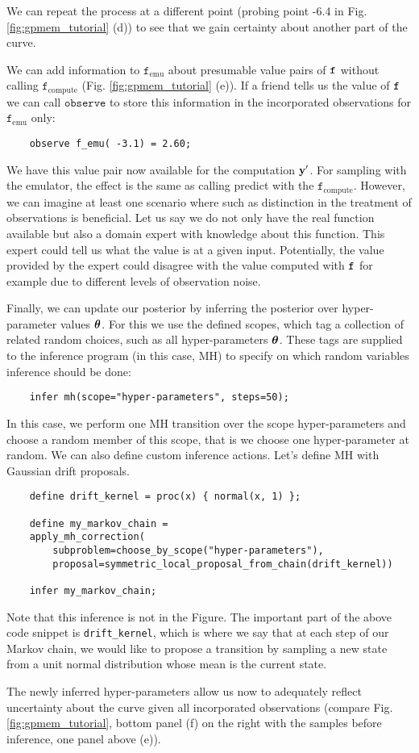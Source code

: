 We can repeat the process at a different point (probing point -6.4 in Fig.
\ref{fig:gpmem_tutorial} (d)) to see that we gain certainty about another part of the curve. 

We can add information to $\texttt{f}_\text{emu}$ about presumable value pairs of $\texttt{f}$ without calling $\texttt{f}_\text{compute}$
(Fig. \ref{fig:gpmem_tutorial} (e)).
If a friend tells us the value of $\texttt{f}$ we can call $\texttt{observe}$ to store this information in the incorporated observations for $\texttt{f}_\text{emu}$ only:
    \begin{lstlisting}
    observe f_emu( -3.1) = 2.60;
    \end{lstlisting}
We have this value pair now available for the computation $\mathbf{y}^\prime$. 
For sampling with the emulator, the effect is the same as calling predict with the $\texttt{f}_\text{compute}$.
However, we can imagine at least one scenario where such as distinction in the treatment of observations 
is beneficial. Let us say we do not only have the real function available but also a domain expert with knowledge 
about this function.
This expert could tell us what the value is at a given input.
Potentially, the value provided by the expert could disagree with the value computed with $\texttt{f}$ for example 
due to different levels of observation noise. 

Finally, we can update our posterior by inferring the posterior over hyper-parameter values $\bm{\theta}$.
For this we use the defined scopes, which tag a collection of related random choices, such
as all hyper-parameters $\bm{\theta}$.
These tags are supplied to the
inference program (in this case, MH) to specify on which random variables inference
should be done:
    \begin{lstlisting}
    infer mh(scope="hyper-parameters", steps=50);
    \end{lstlisting}
In this case, we perform one \ac{MH} transition over the scope hyper-parameters
and choose a random member of this scope, that is we choose one hyper-parameter at random.
We can also define custom inference actions. Let's define \ac{MH} with Gaussian
drift proposals.
    \begin{lstlisting}
    define drift_kernel = proc(x) { normal(x, 1) };

    define my_markov_chain =
	apply_mh_correction(
	    subproblem=choose_by_scope("hyper-parameters"),
	    proposal=symmetric_local_proposal_from_chain(drift_kernel))

    infer my_markov_chain;
    \end{lstlisting}
Note that this inference is not in the Figure. The important part of the above code snippet is \texttt{drift\_kernel}, which is where we say 
that at each step of our Markov chain, we would like to propose a transition by sampling
a new state from a unit normal distribution whose mean is the current state. 

The newly inferred hyper-parameters allow us now to adequately reflect uncertainty
about the curve given all incorporated observations (compare
Fig. \ref{fig:gpmem_tutorial}, bottom panel (f) on  the right with the samples
before inference, one panel above (e)).
